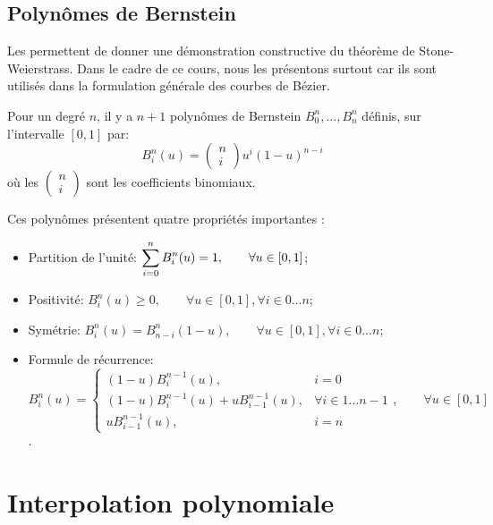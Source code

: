 \medskip
\subsection{Polynômes de Bernstein}

Les  permettent de donner une démonstration constructive du 
théorème de Stone-Weierstrass. 
Dans le cadre de ce cours, nous les présentons surtout car ils sont utilisés dans la formulation 
générale des courbes de Bézier.

\medskip
Pour un degré $n$, il y a $n+1$ polynômes de Bernstein $B^n_0, \dots, B^n_n$ définis, sur l'intervalle 
$[0,1]$ par:
\begin{equation}
    B_i^n(u) = \begin{pmatrix} n \\ i \end{pmatrix} u^i \left( 1-u \right)^{n-i}
\end{equation}
où les $\begin{pmatrix} n \\ i \end{pmatrix}$ sont les coefficients binomiaux.

\medskip
Ces polynômes présentent quatre propriétés importantes :
\begin{itemize}
   \item Partition de l'unité: $\displaystyle\sum_{i=0}^n B_i^n(u) = 1, \qquad \forall u \in [0,1]$;
   \item Positivité: $B_i^n(u) \geq 0, \qquad \forall u \in [0,1], \forall i \in 0 \dots n$;
   \item Symétrie: $B_i^n(u) = B_{n-i}^n(1-u), \qquad \forall u \in [0,1], \forall i \in 0 \dots n$;
   \item Formule de récurrence: $B_i^n(u) = \begin{cases} (1-u)B_i^{n-1}(u),& i 
= 0\\ (1-u)B_i^{n-1}(u) + u B_{i-1}^{n-1}(u),&\forall i \in 1 \dots n-1\\ uB_{i-1}^{n-1}(u),& i = n \end{cases} , 
\qquad \forall u \in [0,1]$.
\end{itemize}



\medskip
\section{Interpolation polynomiale}

